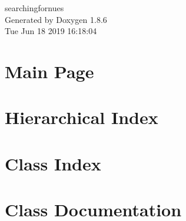 \documentclass[twoside]{book}
\newcommand{\clearemptydoublepage}{%
  \newpage{\pagestyle{empty}\cleardoublepage}%
}
\begin{document}
\hypersetup{pageanchor=false}
\begin{titlepage}
\vspace*{7cm}
\begin{center}%
{\Large searchingfornues }\\
\vspace*{1cm}
{\large Generated by Doxygen 1.8.6}\\
\vspace*{0.5cm}
{\small Tue Jun 18 2019 16:18:04}\\
\end{center}
\end{titlepage}
\clearemptydoublepage
\tableofcontents
\clearemptydoublepage
{}
\hypersetup{pageanchor=true}

\chapter{Main Page}
\label{index}\hypertarget{index}{}
\chapter{Hierarchical Index}

\chapter{Class Index}

\chapter{Class Documentation}




































\newpage
{}
{}
\printindex
\end{document}
